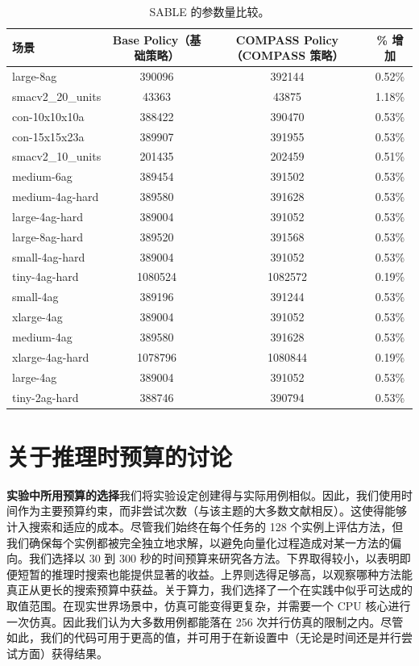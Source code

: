 \documentclass[11pt,UTF8,fontset=fandol]{ctexart}
\begin{document}
\begin{table}[H]\centering
\caption{SABLE 的参数量比较。}
\label{tab:10}
\begin{tabular}{lccc}
\toprule
场景 & Base Policy（基础策略） & COMPASS Policy（COMPASS 策略） & \% 增加\\
\midrule
large-8ag & 390096 & 392144 & 0.52\%\\
smacv2\_20\_units & 43363 & 43875 & 1.18\%\\
con-10x10x10a & 388422 & 390470 & 0.53\%\\
con-15x15x23a & 389907 & 391955 & 0.53\%\\
smacv2\_10\_units & 201435 & 202459 & 0.51\%\\
medium-6ag & 389454 & 391502 & 0.53\%\\
medium-4ag-hard & 389580 & 391628 & 0.53\%\\
large-4ag-hard & 389004 & 391052 & 0.53\%\\
large-8ag-hard & 389520 & 391568 & 0.53\%\\
small-4ag-hard & 389004 & 391052 & 0.53\%\\
tiny-4ag-hard & 1080524 & 1082572 & 0.19\%\\
small-4ag & 389196 & 391244 & 0.53\%\\
xlarge-4ag & 389004 & 391052 & 0.53\%\\
medium-4ag & 389580 & 391628 & 0.53\%\\
xlarge-4ag-hard & 1078796 & 1080844 & 0.19\%\\
large-4ag & 389004 & 391052 & 0.53\%\\
tiny-2ag-hard & 388746 & 390794 & 0.53\%\\
\bottomrule
\end{tabular}
\end{table}

\section{关于推理时预算的讨论}

\textbf{实验中所用预算的选择}\quad 我们将实验设定创建得与实际用例相似。因此，我们使用时间作为主要预算约束，而非尝试次数（与该主题的大多数文献相反）。这使得能够计入搜索和适应的成本。尽管我们始终在每个任务的 128 个实例上评估方法，但我们确保每个实例都被完全独立地求解，以避免向量化过程造成对某一方法的偏向。我们选择以 30 到 300 秒的时间预算来研究各方法。下界取得较小，以表明即便短暂的推理时搜索也能提供显著的收益。上界则选得足够高，以观察哪种方法能真正从更长的搜索预算中获益。关于算力，我们选择了一个在实践中似乎可达成的取值范围。在现实世界场景中，仿真可能变得更复杂，并需要一个 CPU 核心进行一次仿真。因此我们认为大多数用例都能落在 256 次并行仿真的限制之内。尽管如此，我们的代码可用于更高的值，并可用于在新设置中（无论是时间还是并行尝试方面）获得结果。
\end{document}

